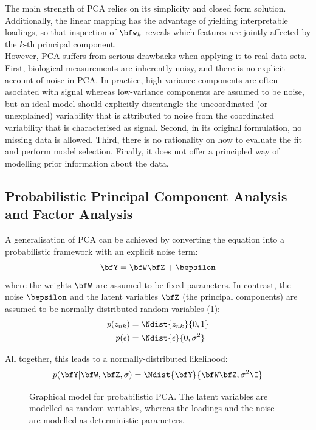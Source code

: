  
The main strength of PCA relies on its simplicity and closed form solution. Additionally, the linear mapping has the advantage of yielding interpretable loadings, so that inspection of $\bfw_k$ reveals which features are jointly affected by the $k$-th principal component.\\
However, PCA suffers from serious drawbacks when applying it to real data sets. First, biological measurements are inherently noisy, and there is no explicit account of noise in PCA. In practice, high variance components are often asociated with signal whereas low-variance components are assumed to be noise, but an ideal model should explicitly disentangle the uncoordinated (or unexplained) variability that is attributed to noise from the coordinated variability that is characterised as signal. Second, in its original formulation, no missing data is allowed. Third, there is no rationality on how to evaluate the fit and perform model selection. Finally, it does not offer a principled way of modelling prior information about the data.

\subsection{Probabilistic Principal Component Analysis and Factor Analysis}

A generalisation of PCA can be achieved by converting the equation  into a probabilistic framework with an explicit noise term\cite{TippingBishop}:
\begin{equation}
	\bfY = \bfW \bfZ + \bepsilon
\end{equation}
where the weights $\bfW$ are assumed to be fixed parameters. In contrast, the noise $\bepsilon$ and the latent variables $\bfZ$ (the principal components) are assumed to be normally distributed random variables (\cref{fig:pPCA}):
\begin{align}
	p(z_{nk}) &= \Ndist{z_{nk}}{0,1} \\
	p(\epsilon) &= \Ndist {\epsilon}{0,\sigma^2}
\end{align}

All together, this leads to a normally-distributed likelihood:
\begin{equation}
	p(\bfY|\bfW,\bfZ,\sigma) = \Ndist{\bfY}{\bfW \bfZ,\sigma^2 \I}
\end{equation}

\begin{figure}[H] \begin{center}
	
	\label{fig:pPCA}
	\caption{Graphical model for probabilistic PCA. The latent variables are modelled as random variables, whereas the loadings and the noise are modelled as deterministic parameters.}
\end{center} \end{figure}

